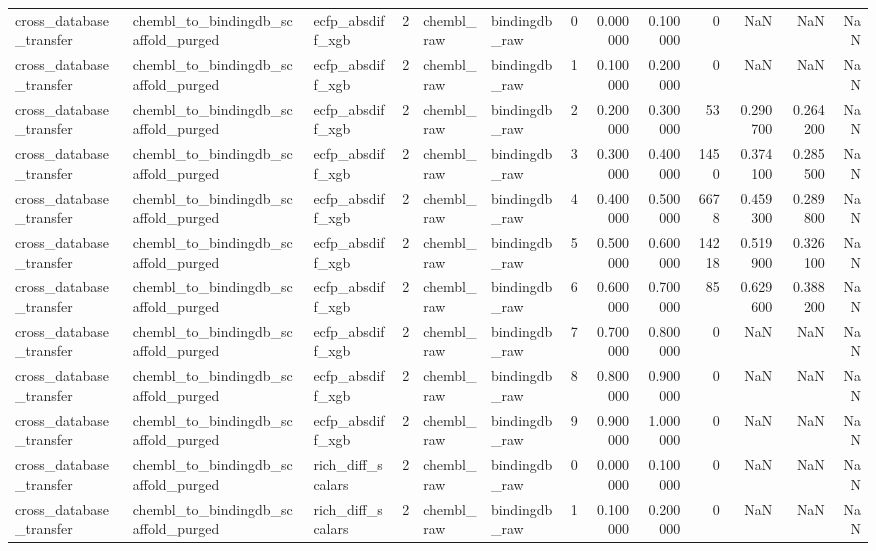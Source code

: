 \begin{longtable}{lllrllrrrrrrr}
cross\_database\_transfer & chembl\_to\_bindingdb\_scaffold\_purged & ecfp\_absdiff\_xgb & 2 & chembl\_raw & bindingdb\_raw & 0 & 0.000000 & 0.100000 & 0 & NaN & NaN & NaN \\
cross\_database\_transfer & chembl\_to\_bindingdb\_scaffold\_purged & ecfp\_absdiff\_xgb & 2 & chembl\_raw & bindingdb\_raw & 1 & 0.100000 & 0.200000 & 0 & NaN & NaN & NaN \\
cross\_database\_transfer & chembl\_to\_bindingdb\_scaffold\_purged & ecfp\_absdiff\_xgb & 2 & chembl\_raw & bindingdb\_raw & 2 & 0.200000 & 0.300000 & 53 & 0.290700 & 0.264200 & NaN \\
cross\_database\_transfer & chembl\_to\_bindingdb\_scaffold\_purged & ecfp\_absdiff\_xgb & 2 & chembl\_raw & bindingdb\_raw & 3 & 0.300000 & 0.400000 & 1450 & 0.374100 & 0.285500 & NaN \\
cross\_database\_transfer & chembl\_to\_bindingdb\_scaffold\_purged & ecfp\_absdiff\_xgb & 2 & chembl\_raw & bindingdb\_raw & 4 & 0.400000 & 0.500000 & 6678 & 0.459300 & 0.289800 & NaN \\
cross\_database\_transfer & chembl\_to\_bindingdb\_scaffold\_purged & ecfp\_absdiff\_xgb & 2 & chembl\_raw & bindingdb\_raw & 5 & 0.500000 & 0.600000 & 14218 & 0.519900 & 0.326100 & NaN \\
cross\_database\_transfer & chembl\_to\_bindingdb\_scaffold\_purged & ecfp\_absdiff\_xgb & 2 & chembl\_raw & bindingdb\_raw & 6 & 0.600000 & 0.700000 & 85 & 0.629600 & 0.388200 & NaN \\
cross\_database\_transfer & chembl\_to\_bindingdb\_scaffold\_purged & ecfp\_absdiff\_xgb & 2 & chembl\_raw & bindingdb\_raw & 7 & 0.700000 & 0.800000 & 0 & NaN & NaN & NaN \\
cross\_database\_transfer & chembl\_to\_bindingdb\_scaffold\_purged & ecfp\_absdiff\_xgb & 2 & chembl\_raw & bindingdb\_raw & 8 & 0.800000 & 0.900000 & 0 & NaN & NaN & NaN \\
cross\_database\_transfer & chembl\_to\_bindingdb\_scaffold\_purged & ecfp\_absdiff\_xgb & 2 & chembl\_raw & bindingdb\_raw & 9 & 0.900000 & 1.000000 & 0 & NaN & NaN & NaN \\
cross\_database\_transfer & chembl\_to\_bindingdb\_scaffold\_purged & rich\_diff\_scalars & 2 & chembl\_raw & bindingdb\_raw & 0 & 0.000000 & 0.100000 & 0 & NaN & NaN & NaN \\
cross\_database\_transfer & chembl\_to\_bindingdb\_scaffold\_purged & rich\_diff\_scalars & 2 & chembl\_raw & bindingdb\_raw & 1 & 0.100000 & 0.200000 & 0 & NaN & NaN & NaN \\

\end{longtable}
